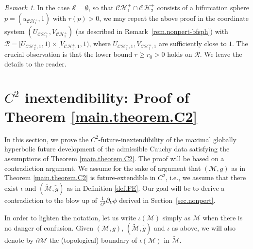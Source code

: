 \documentclass[10pt, reqno]{amsart}
\theoremstyle{definition}
\theoremstyle{remark}
\newtheorem{remark}[theorem]{Remark}
\numberwithin{equation}{section}
\newcommand{\rd}{\partial}
\newcommand{\0}{\emptyset}
\newcommand{\Omg}{\Omega}
\newcommand{\calC}{\mathcal C}
\newcommand{\calH}{\mathcal H}
\newcommand{\calR}{\mathcal R}
\newcommand{\calS}{\mathcal S}
\newcommand{\CH}{\calC \calH^{+}}		%
\begin{document}
\begin{remark} \label{rem.nonpert-bfsph-pf}
In the case $\calS = \0$, so that $\CH_{1} \cap \CH_{2}$ consists of a bifurcation sphere $p = (u_{\CH_{1}}, 1)$ with $r(p) > 0$, we may repeat the above proof in the coordinate system $(U_{\CH_{2}}, V_{\CH_{1}})$ (as described in Remark~\ref{rem.nonpert-bfsph}) with $\calR = [U_{\CH_{2}, 1}, 1) \times [V_{\CH_{1}, 1}, 1)$, where $U_{\CH_{2}, 1}, V_{\CH_{1}, 1}$ are sufficiently close to $1$. The crucial observation is that the lower bound $r \geq r_{0} > 0$ holds on $\calR$. We leave the details to the reader.
\end{remark}


\section{$C^2$ inextendibility: Proof of Theorem \ref{main.theorem.C2}}\label{sec.main.theorem.C2}

In this section, we prove the $C^2$-future-inextendibility of the maximal globally hyperbolic future development of the admissible Cauchy data satisfying the assumptions of Theorem \ref{main.theorem.C2}. The proof will be based on a contradiction argument. We assume for the sake of argument that $(\mathcal M,g)$ as in Theorem \ref{main.theorem.C2} is future-extendible in $C^2$, i.e., we assume that there exist $\iota$ and $(\widetilde{\mathcal M}, \tilde{g})$ as in Definition \ref{def.FE}. 
Our goal will be to derive a contradiction to the blow up of $\frac{1}{\Omg^{2}}{\rd_{V} \phi}$ derived in Section~\ref{sec.nonpert}.


In order to lighten the notation, let us write $\iota(\mathcal M)$ simply as $\mathcal M$ when there is no danger of confusion. Given $(\mathcal M,g)$, $(\widetilde{\mathcal M}, \tilde{g})$ and $\iota$ as above, we will also denote by $\rd\mathcal M$ the (topological) boundary of $\iota(\mathcal M)$ in $\widetilde{\mathcal M}$.
\end{document}
